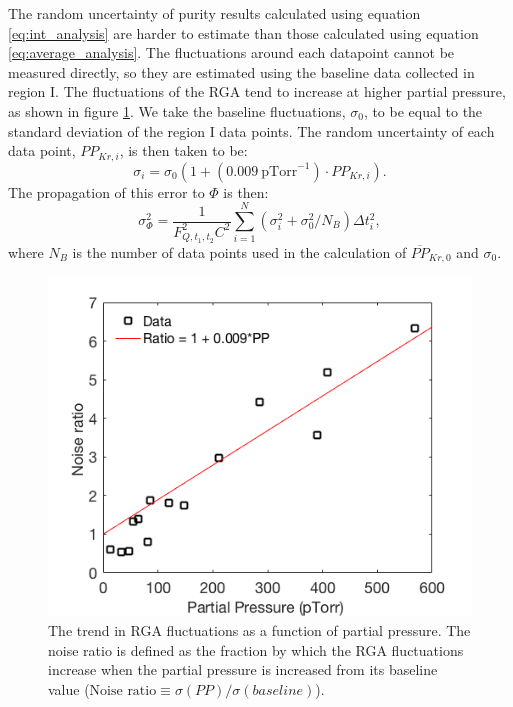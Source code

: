 The random uncertainty of purity results calculated using equation \ref{eq:int_analysis} are harder to estimate than those calculated using equation \ref{eq:average_analysis}. The fluctuations around each datapoint cannot be measured directly, so they are estimated using the baseline data collected in region I. The fluctuations of the RGA tend to increase at higher partial pressure, as shown in figure \ref{fig:RGAnoise}. We take the baseline fluctuations, $\sigma_0$, to be equal to the standard deviation of the region I data points. The random uncertainty of each data point, $PP_{Kr,i}$, is then taken to be:
\begin{equation}
\label{eq:preserr}
\sigma_i=\sigma_{0}\left(1+(0.009 \ \text{pTorr}^{-1})\cdot PP_{Kr,i}\right).
\end{equation}
The propagation of this error to $\Phi$ is then:
\begin{equation}
\sigma_{\Phi}^2=\frac{1}{F_{Q,t_1,t_2}^2C^2}\sum_{i=1}^{N}(\sigma_i^2+\sigma_0^2/N_B)\Delta t_i^2,
\end{equation}
where $N_B$ is the number of data points used in the calculation of $\overline{PP}_{Kr,0}$ and $\sigma_0$.
\begin{figure}[h!]
  \includegraphics[width=\linewidth]{Figures/RGA_Noise_v_PP.png}
  \caption{The trend in RGA fluctuations as a function of partial pressure. The noise ratio is defined as the fraction by which the RGA fluctuations increase when the partial pressure is increased from its baseline value ($\textrm{Noise ratio} \equiv \sigma(PP)/\sigma(baseline)$). }
  \label{fig:RGAnoise}
\end{figure}


